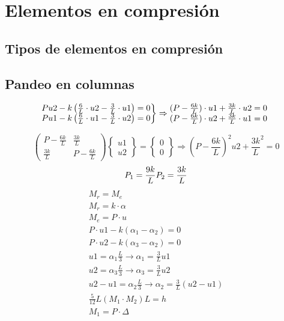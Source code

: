 %
%

\chapter{Elementos en compresión}
\section{Tipos de elementos en compresión}
\section{Pandeo en columnas}
\begin{example}
\[\left.\begin{matrix}
P u2-k\left(\frac{6}{L}\cdot u2-\frac{3}{L}\cdot u1\right)=0\\ P u1-k\left(\frac{6}{L}\cdot u1-\frac{3}{L}\cdot u2\right)=0

\end{matrix}\right\}\Rightarrow \begin{matrix}
(P-\frac{6k}{L})\cdot u1+\frac{3k}{L}\cdot u2=0\\
(P-\frac{6k}{L})\cdot u2+\frac{3k}{L}\cdot u1=0
\end{matrix}\\ \]

\[\begin{pmatrix}
P-\frac{6k}{L} &\frac{3k}{L} \\ 
 \frac{3k}{L}&P-\frac{6k}{L} 
\end{pmatrix}\begin{Bmatrix}
u1\\u2

\end{Bmatrix}=\begin{Bmatrix}
0\\0

\end{Bmatrix}\Rightarrow (P-\frac{6k}{L})^2 u2+\frac{3k}{L}^2=0\]
\[
P_1=\frac{9k}{L}\\
P_2=\frac{3k}{L}\]
\begin{align*}
M_r=M_e\\
M_r=k\cdot\alpha\\
M_e=P\cdot u\\
P\cdot u1-k(\alpha_1-\alpha_2)=0\\
P\cdot u2-k(\alpha_3-\alpha_2)=0\\
u1=\alpha_1\frac{L}{3}\rightarrow \alpha_1=\frac{3}{L}u1\\
u2=\alpha_3\frac{L}{3}\rightarrow \alpha_3=\frac{3}{L}u2\\
u2-u1=\alpha_2\frac{L}{3}\rightarrow \alpha_2=\frac{3}{L}(u2-u1)\\
\frac{5}{12}L(M_1\cdot M_2)L=h\\
M_1=P\cdot \Delta\\
\end{align*}
\end{example}

